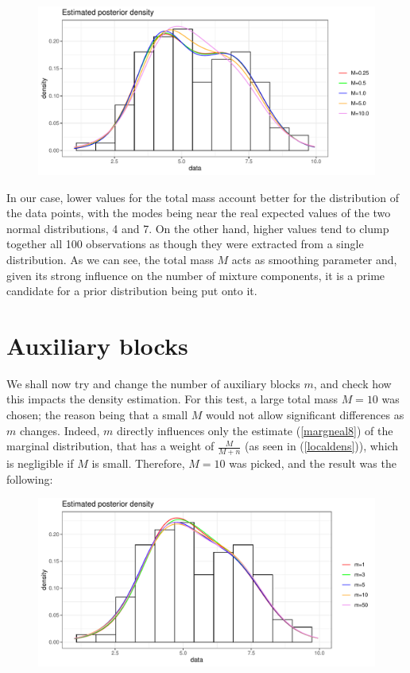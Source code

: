 \clearpage

\begin{figure}[h]
	\centering
	\includegraphics[scale=0.6]{etc/dens_withMm3.pdf}
\end{figure}


In our case, lower values for the total mass account better for the distribution of the data points, with the modes being near the real expected values of the two normal distributions, 4 and 7.
On the other hand, higher values tend to clump together all 100 observations as though they were extracted from a single distribution.
As we can see, the total mass $M$ acts as smoothing parameter and, given its strong influence on the number of mixture components, it is a prime candidate for a prior distribution being put onto it.



\section{Auxiliary blocks}
We shall now try and change the number of auxiliary blocks $m$, and check how this impacts the density estimation.
For this test, a large total mass $M=10$ was chosen; the reason being that a small $M$ would not allow significant differences as $m$ changes.
Indeed, $m$ directly influences only the estimate (\ref{margneal8}) of the marginal distribution, that has a weight of $\frac{M}{M+n}$ (as seen in (\ref{localdens})), which is negligible if $M$ is small.
Therefore, $M=10$ was picked, and the result was the following:


\begin{figure}[h]
	\centering
	\includegraphics[scale=0.6]{etc/dens_withmM10.pdf}
\end{figure}

